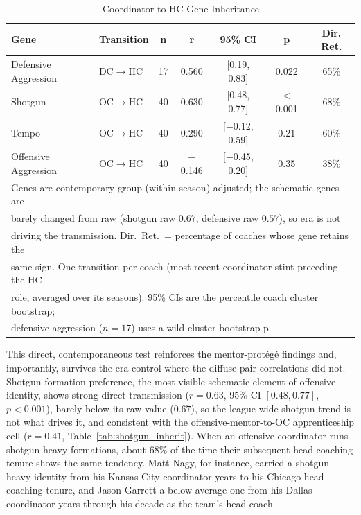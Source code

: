 \documentclass[USenglish]{article}
\theoremstyle{dgthm}
\theoremstyle{dgdef}
\begin{document}
\begin{table}[H]
\caption{Coordinator-to-HC Gene Inheritance}
\label{tab:gene_inherit}
\begin{tabular}{llccccc}
\toprule
\textbf{Gene} & \textbf{Transition} & \textbf{n} & \textbf{r} & \textbf{95\% CI} & \textbf{p} & \textbf{Dir. Ret.} \\
\midrule
Defensive Aggression & DC$\rightarrow$HC & 17 & 0.560 & [0.19, 0.83] & 0.022 & 65\% \\
Shotgun & OC$\rightarrow$HC & 40 & 0.630 & [0.48, 0.77] & $<$0.001 & 68\% \\
Tempo & OC$\rightarrow$HC & 40 & 0.290 & [$-$0.12, 0.59] & 0.21 & 60\% \\
Offensive Aggression & OC$\rightarrow$HC & 40 & $-$0.146 & [$-$0.45, 0.20] & 0.35 & 38\% \\
\midrule
\multicolumn{7}{l}{\small Genes are contemporary-group (within-season) adjusted; the schematic genes are}\\
\multicolumn{7}{l}{\small barely changed from raw (shotgun raw $0.67$, defensive raw $0.57$), so era is not}\\
\multicolumn{7}{l}{\small driving the transmission. Dir.\ Ret.\ = percentage of coaches whose gene retains the}\\
\multicolumn{7}{l}{\small same sign. One transition per coach (most recent coordinator stint preceding the HC}\\
\multicolumn{7}{l}{\small role, averaged over its seasons). 95\% CIs are the percentile coach cluster bootstrap;}\\
\multicolumn{7}{l}{\small defensive aggression ($n=17$) uses a wild cluster bootstrap p.}\\
\bottomrule
\end{tabular}
\end{table}

This direct, contemporaneous test reinforces the mentor-prot\'{e}g\'{e} findings and, importantly, survives the era control where the diffuse pair correlations did not. Shotgun formation preference, the most visible schematic element of offensive identity, shows strong direct transmission ($r=0.63$, 95\% CI $[0.48, 0.77]$, $p<0.001$), barely below its raw value ($0.67$), so the league-wide shotgun trend is not what drives it, and consistent with the offensive-mentor-to-OC apprenticeship cell ($r=0.41$, Table~\ref{tab:shotgun_inherit}). When an offensive coordinator runs shotgun-heavy formations, about 68\% of the time their subsequent head-coaching tenure shows the same tendency. Matt Nagy, for instance, carried a shotgun-heavy identity from his Kansas City coordinator years to his Chicago head-coaching tenure, and Jason Garrett a below-average one from his Dallas coordinator years through his decade as the team's head coach.
\end{document}
